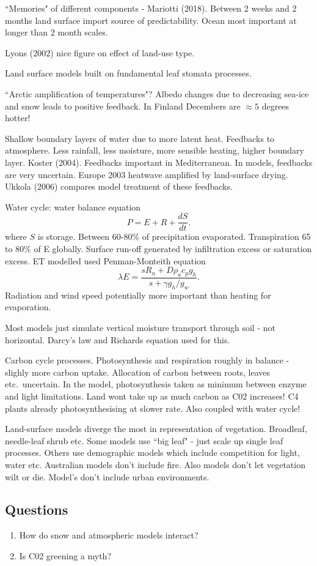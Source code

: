 \documentclass[12pt]{article}
\begin{document}
``Memories" of different components - Mariotti (2018). Between 2 weeks and 2 months land surface import source of predictability. Ocean most important at longer than 2 month scales.

Lyons (2002) nice figure on effect of land-use type.

Land surface models built on fundamental leaf stomata processes. 

``Arctic amplification of temperatures"? Albedo changes due to decreasing sea-ice and snow leads to positive feedback. In Finland Decembers are $\approx 5$ degrees hotter! 

Shallow boundary layers of water due to more latent heat. Feedbacks to atmosphere. Less rainfall, less moisture, more sensible heating, higher boundary layer. Koster (2004). Feedbacks important in Mediterranean. In models, feedbacks are very uncertain. Europe 2003 heatwave amplified by land-surface drying. Ukkola (2006) compares model treatment of these feedbacks. 

Water cycle: water balance equation
$$ P = E +R +\frac{dS}{dt}.$$
where $S$ is storage. Between 60-80\% of precipitation evaporated. Transpiration 65 to 80\% of E globally. Surface run-off generated by infiltration excess or saturation excess. ET modelled used Penman-Monteith equation 
$$\lambda E = \frac{sR_n+D\rho_ac_p g_h}{s+\gamma g_h/g_w}.$$
Radiation and wind speed potentially more important than heating for evaporation. 

Most models just simulate vertical moisture transport through soil - not horizontal. Darcy's law and Richards equation used for this. 

Carbon cycle processes. Photosynthesis and respiration roughly in balance - slighly more carbon uptake. Allocation of carbon between roots, leaves etc.~uncertain. In the model, photosynthesis taken as minimum between enzyme and light limitations. Land wont take up as much carbon as C02 increases! C4 plants already photosynthesising at slower rate. Also coupled with water cycle! 

Land-surface models diverge the most in representation of vegetation. Broadleaf, needle-leaf shrub etc. Some models use ``big leaf" - just scale up single leaf processes. Others use demographic models which include competition for light, water etc. Australian models don't include fire. Also models don't let vegetation wilt or die. Model's don't include urban environments. 

\subsection{Questions}
\begin{enumerate}
\item
How do snow and atmospheric models interact?
\item
Is C02 greening a myth?
\end{enumerate}
\end{document}
